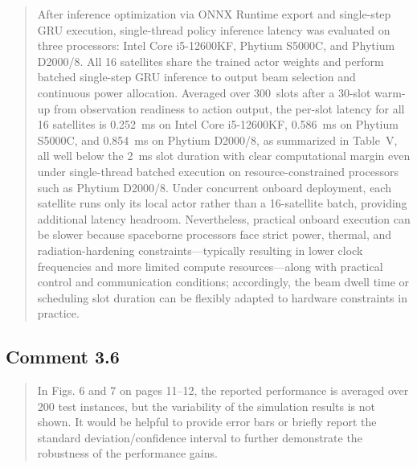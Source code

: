 \documentclass[11pt,a4paper]{article}
\begin{document}

\begin{quote}\small\color{revisionblue}
After inference optimization via ONNX Runtime export and single-step GRU execution, single-thread policy inference latency was evaluated on three processors: Intel Core i5-12600KF, Phytium S5000C, and Phytium D2000/8. All 16 satellites share the trained actor weights and perform batched single-step GRU inference to output beam selection and continuous power allocation. Averaged over 300~slots after a 30-slot warm-up from observation readiness to action output, the per-slot latency for all 16 satellites is 0.252~ms on Intel Core i5-12600KF, 0.586~ms on Phytium S5000C, and 0.854~ms on Phytium D2000/8, as summarized in Table~V, all well below the 2~ms slot duration with clear computational margin even under single-thread batched execution on resource-constrained processors such as Phytium D2000/8. Under concurrent onboard deployment, each satellite runs only its local actor rather than a 16-satellite batch, providing additional latency headroom. Nevertheless, practical onboard execution can be slower because spaceborne processors face strict power, thermal, and radiation-hardening constraints---typically resulting in lower clock frequencies and more limited compute resources---along with practical control and communication conditions; accordingly, the beam dwell time or scheduling slot duration can be flexibly adapted to hardware constraints in practice.
\par
\end{quote}


\subsection*{Comment 3.6}

\begin{quote}\small In Figs. 6 and 7 on pages 11--12, the reported performance is averaged over 200 test instances, but the variability of the simulation results is not shown. It would be helpful to provide error bars or briefly report the standard deviation/confidence interval to further demonstrate the robustness of the performance gains.\end{quote}
\end{document}
